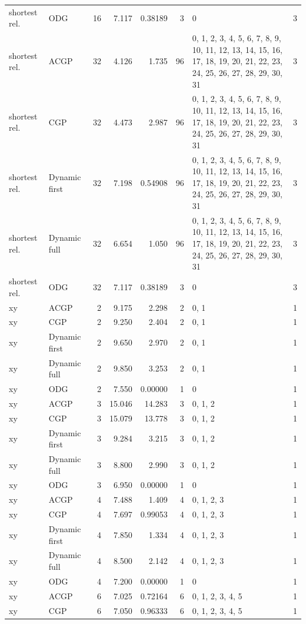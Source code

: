 \documentclass[10pt,a4paper]{article}
\begin{document}
\begin{longtable}{@{}p{23mm}p{29mm}rrrrp{36mm}r@{}}
shortest rel. & ODG & 16 & 7.117 & 0.38189 & 3 & 0 & 3 \\
shortest rel. & ACGP & 32 & 4.126 & 1.735 & 96 & 0, 1, 2, 3, 4, 5, 6, 7, 8, 9, 10, 11, 12, 13, 14, 15, 16, 17, 18, 19, 20, 21, 22, 23, 24, 25, 26, 27, 28, 29, 30, 31 & 3 \\
shortest rel. & CGP & 32 & 4.473 & 2.987 & 96 & 0, 1, 2, 3, 4, 5, 6, 7, 8, 9, 10, 11, 12, 13, 14, 15, 16, 17, 18, 19, 20, 21, 22, 23, 24, 25, 26, 27, 28, 29, 30, 31 & 3 \\
shortest rel. & Dynamic first & 32 & 7.198 & 0.54908 & 96 & 0, 1, 2, 3, 4, 5, 6, 7, 8, 9, 10, 11, 12, 13, 14, 15, 16, 17, 18, 19, 20, 21, 22, 23, 24, 25, 26, 27, 28, 29, 30, 31 & 3 \\
shortest rel. & Dynamic full & 32 & 6.654 & 1.050 & 96 & 0, 1, 2, 3, 4, 5, 6, 7, 8, 9, 10, 11, 12, 13, 14, 15, 16, 17, 18, 19, 20, 21, 22, 23, 24, 25, 26, 27, 28, 29, 30, 31 & 3 \\
shortest rel. & ODG & 32 & 7.117 & 0.38189 & 3 & 0 & 3 \\
xy & ACGP & 2 & 9.175 & 2.298 & 2 & 0, 1 & 1 \\
xy & CGP & 2 & 9.250 & 2.404 & 2 & 0, 1 & 1 \\
xy & Dynamic first & 2 & 9.650 & 2.970 & 2 & 0, 1 & 1 \\
xy & Dynamic full & 2 & 9.850 & 3.253 & 2 & 0, 1 & 1 \\
xy & ODG & 2 & 7.550 & 0.00000 & 1 & 0 & 1 \\
xy & ACGP & 3 & 15.046 & 14.283 & 3 & 0, 1, 2 & 1 \\
xy & CGP & 3 & 15.079 & 13.778 & 3 & 0, 1, 2 & 1 \\
xy & Dynamic first & 3 & 9.284 & 3.215 & 3 & 0, 1, 2 & 1 \\
xy & Dynamic full & 3 & 8.800 & 2.990 & 3 & 0, 1, 2 & 1 \\
xy & ODG & 3 & 6.950 & 0.00000 & 1 & 0 & 1 \\
xy & ACGP & 4 & 7.488 & 1.409 & 4 & 0, 1, 2, 3 & 1 \\
xy & CGP & 4 & 7.697 & 0.99053 & 4 & 0, 1, 2, 3 & 1 \\
xy & Dynamic first & 4 & 7.850 & 1.334 & 4 & 0, 1, 2, 3 & 1 \\
xy & Dynamic full & 4 & 8.500 & 2.142 & 4 & 0, 1, 2, 3 & 1 \\
xy & ODG & 4 & 7.200 & 0.00000 & 1 & 0 & 1 \\
xy & ACGP & 6 & 7.025 & 0.72164 & 6 & 0, 1, 2, 3, 4, 5 & 1 \\
xy & CGP & 6 & 7.050 & 0.96333 & 6 & 0, 1, 2, 3, 4, 5 & 1 \\

\end{longtable}
\end{document}
